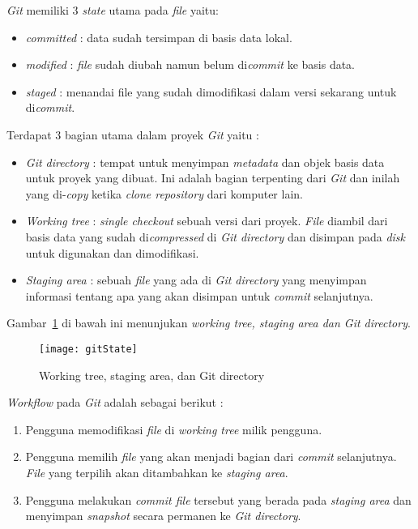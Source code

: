 \textit{Git} memiliki 3 \textit{state} utama pada \textit{file} yaitu: 

\begin{itemize}
	\item \textit{committed} : data sudah tersimpan di basis data lokal.
	\item \textit{modified} : \textit{file} sudah diubah namun belum di\textit{commit} ke basis data.
	\item \textit{staged} : menandai file yang sudah dimodifikasi dalam versi sekarang untuk di\textit{commit}.
\end{itemize}

Terdapat 3 bagian utama dalam proyek \textit{Git} yaitu : 

\begin{itemize}
	\item \textit{Git directory} : tempat untuk menyimpan \textit{metadata} dan objek basis data untuk proyek yang dibuat. Ini adalah bagian terpenting dari \textit{Git} dan inilah yang di-\textit{copy} ketika \textit{clone repository} dari komputer lain.
	\item \textit{Working tree} : \textit{single checkout} sebuah versi dari proyek. \textit{File} diambil dari basis data yang sudah di\textit{compressed} di \textit{Git directory} dan disimpan pada \textit{disk} untuk digunakan dan dimodifikasi.
	\item \textit{Staging area} : sebuah \textit{file} yang ada di \textit{Git directory} yang menyimpan informasi tentang apa yang akan disimpan untuk \textit{commit} selanjutnya.  
\end{itemize}

Gambar~\ref{fig:gitState} di bawah ini menunjukan \textit{working tree, staging area dan Git directory}.

\begin{figure}[H]
	\centering  
	\texttt{[image: gitState]}  
	\caption[Working tree, staging area, dan Git directory]{Working tree, staging area, dan Git directory}
	\label{fig:gitState} 
\end{figure}

\textit{Workflow} pada \textit{Git} adalah sebagai berikut :

\begin{enumerate}
	\item Pengguna memodifikasi \textit{file} di \textit{working tree} milik pengguna.
	\item Pengguna memilih \textit{file} yang akan menjadi bagian dari \textit{commit} selanjutnya. \textit{File} yang terpilih akan ditambahkan ke \textit{staging area}. 
	\item Pengguna melakukan \textit{commit file} tersebut yang berada pada \textit{staging area} dan menyimpan \textit{snapshot} secara permanen ke \textit{Git directory}.
\end{enumerate}

